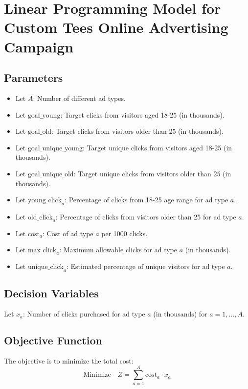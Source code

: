 \documentclass{article}
\begin{document}
\section*{Linear Programming Model for Custom Tees Online Advertising Campaign}

\subsection*{Parameters}
\begin{itemize}
    \item Let \( A \): Number of different ad types.
    \item Let \( \text{goal\_young} \): Target clicks from visitors aged 18-25 (in thousands).
    \item Let \( \text{goal\_old} \): Target clicks from visitors older than 25 (in thousands).
    \item Let \( \text{goal\_unique\_young} \): Target unique clicks from visitors aged 18-25 (in thousands).
    \item Let \( \text{goal\_unique\_old} \): Target unique clicks from visitors older than 25 (in thousands).
    \item Let \( \text{young\_click}_{a} \): Percentage of clicks from 18-25 age range for ad type \( a \).
    \item Let \( \text{old\_click}_{a} \): Percentage of clicks from visitors older than 25 for ad type \( a \).
    \item Let \( \text{cost}_{a} \): Cost of ad type \( a \) per 1000 clicks.
    \item Let \( \text{max\_click}_{a} \): Maximum allowable clicks for ad type \( a \) (in thousands).
    \item Let \( \text{unique\_click}_{a} \): Estimated percentage of unique visitors for ad type \( a \).
\end{itemize}

\subsection*{Decision Variables}
Let \( x_a \): Number of clicks purchased for ad type \( a \) (in thousands) for \( a = 1, \ldots, A \).

\subsection*{Objective Function}
The objective is to minimize the total cost:
\[
\text{Minimize} \quad Z = \sum_{a=1}^{A} \text{cost}_{a} \cdot x_{a}
\]
\end{document}
